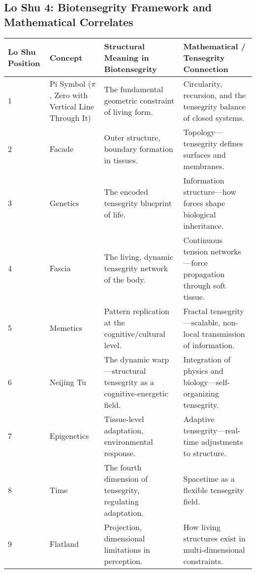 \documentclass{article}
\begin{document}
\begin{landscape}

\section*{Lo Shu 4: Biotensegrity Framework and Mathematical Correlates}

\renewcommand{\arraystretch}{1.4}

\begin{tabular}{|p{2cm}|p{4cm}|p{6cm}|p{6cm}|}
\hline
\textbf{Lo Shu Position} & 
\textbf{Concept} & 
\textbf{Structural Meaning in Biotensegrity} & 
\textbf{Mathematical / Tensegrity Connection} \\
\hline

1 & 
Pi Symbol ($\pi$, Zero with Vertical Line Through It) & 
The fundamental geometric constraint of living form. & 
Circularity, recursion, and the tensegrity balance of closed systems. \\
\hline

2 & 
Facade & 
Outer structure, boundary formation in tissues. & 
Topology—tensegrity defines surfaces and membranes. \\
\hline

3 & 
Genetics & 
The encoded tensegrity blueprint of life. & 
Information structure—how forces shape biological inheritance. \\
\hline

4 & 
Fascia & 
The living, dynamic tensegrity network of the body. & 
Continuous tension networks—force propagation through soft tissue. \\
\hline

5 & 
Memetics & 
Pattern replication at the cognitive/cultural level. & 
Fractal tensegrity—scalable, non-local transmission of information. \\
\hline

6 & 
Neijing Tu & 
The dynamic warp—structural tensegrity as a cognitive-energetic field. & 
Integration of physics and biology—self-organizing tensegrity. \\
\hline

7 & 
Epigenetics & 
Tissue-level adaptation, environmental response. & 
Adaptive tensegrity—real-time adjustments to structure. \\
\hline

8 & 
Time & 
The fourth dimension of tensegrity, regulating adaptation. & 
Spacetime as a flexible tensegrity field. \\
\hline

9 & 
Flatland & 
Projection, dimensional limitations in perception. & 
How living structures exist in multi-dimensional constraints. \\
\hline

\end{tabular}

\end{landscape}
\end{document}
